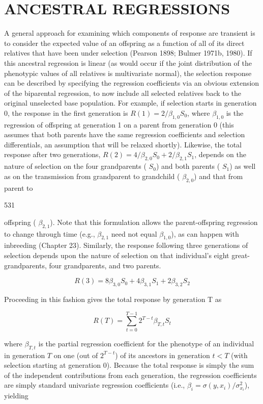 \documentclass{article}
\begin{document}
\section{ANCESTRAL REGRESSIONS}
A general approach for examining which components of response are transient is to consider the expected value of an offspring as a function of all of its direct relatives that have been under selection (Pearson 1898; Bulmer 1971b, 1980). If this ancestral regression is linear (as would occur if the joint distribution of the phenotypic values of all relatives is multivariate normal), the selection response can be described by specifying the regression coefficients via an obvious extension of the biparental regression, to now include all selected relatives back to the original unselected base population. For example, if selection starts in generation 0, the response in the first generation is  $ R(1) = 2 / \beta_{1,0} S_{0} $, where  $ \beta_{1,0} $ is the regression of offspring at generation 1 on a parent from generation 0 (this assumes that both parents have the same regression coefficients and selection differentials, an assumption that will be relaxed shortly). Likewise, the total response after two generations,  $ R(2) = 4 / \beta_{2,0} S_{0} + 2 / \beta_{2,1} S_{1} $, depends on the nature of selection on the four grandparents ( $ S_{0} $) and both parents ( $ S_{1} $) as well as on the transmission from grandparent to grandchild ( $ \beta_{2,0} $) and that from parent to

531

offspring ( $ \beta_{2,1} $). Note that this formulation allows the parent-offspring regression to change through time (e.g.,  $ \beta_{2,1} $ need not equal  $ \beta_{1,0} $), as can happen with inbreeding (Chapter 23). Similarly, the response following three generations of selection depends upon the nature of selection on that individual's eight great-grandparents, four grandparents, and two parents.

\begin{equation}
R(3)=8\beta_{3,0}S_{0}+4\beta_{3,1}S_{1}+2\beta_{3,2}S_{2}
\end{equation}

Proceeding in this fashion gives the total response by generation T as

\begin{equation}
R(T)=\sum_{t=0}^{T-1}2^{T-t}\beta_{T,t}S_{t}
\tag{15.11a}
\label{eq:15_11a}
\end{equation}

where  $ \beta_{T,t} $ is the partial regression coefficient for the phenotype of an individual in generation  $ T $ on one (out of  $ 2^{T-t} $) of its ancestors in generation  $ t < T $ (with selection starting at generation 0). Because the total response is simply the sum of the independent contributions from each generation, the regression coefficients are simply standard univariate regression coefficients (i.e.,  $ \beta_i = \sigma(y, x_i)/\sigma_{x_i}^2 $), yielding
\end{document}
